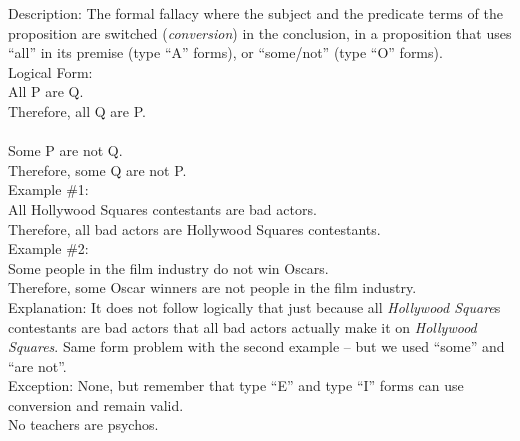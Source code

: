 \documentclass[a4paper,12pt,single,pdftex]{scrartcl}
\begin{document}
    
      Description: The formal fallacy where the subject and the predicate terms of the proposition are switched ({\it conversion}) in the conclusion, in a proposition that uses “all” in its premise (type “A” forms), or “some/not” (type “O” forms).
    \\

    
      Logical Form:
    \\

    
      All P are Q.
    \\

    
      Therefore, all Q are P.
    \\

    
       
    \\

    
      Some P are not Q.
    \\

    
      Therefore, some Q are not P.
    \\

    
      Example \#1:
    \\

    
      All Hollywood Squares contestants are bad actors.
    \\

    
      Therefore, all bad actors are Hollywood Squares contestants.
    \\

    
      Example \#2:
    \\

    
      Some people in the film industry do not win Oscars.
    \\

    
      Therefore, some Oscar winners are not people in the film industry.
    \\

    
      Explanation: It does not follow logically that just because all {\it Hollywood Square}s contestants are bad actors that all bad actors actually make it on {\it Hollywood Squares}.  Same form problem with the second example -- but we used “some” and “are not”.
    \\

    
      Exception: None, but remember that type “E” and type “I” forms can use conversion and remain valid.
    \\

    
      No teachers are psychos.
    \\
\end{document}
